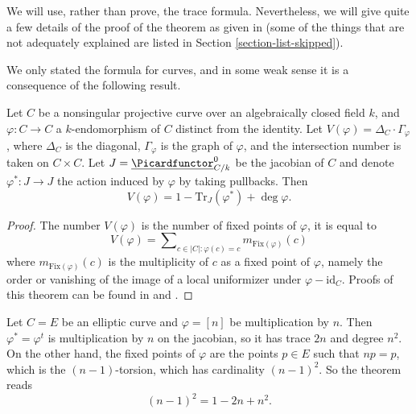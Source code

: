 \noindent
We will use, rather than prove, the trace formula. Nevertheless, we will
give quite a few details of the proof of the theorem as given in
\cite{SGA4.5} (some of the things that are not adequately explained
are listed in Section \ref{section-list-skipped}).

\medskip\noindent
We only stated the formula for curves, and in some weak
sense it is a consequence of the following result.

\begin{theorem}[Weil]
\label{theorem-weil-trace-formula}
Let $C$ be a nonsingular projective curve over an algebraically closed field
$k$, and $\varphi : C \to C$ a $k$-endomorphism of $C$ distinct from the
identity. Let $V(\varphi) = \Delta_C \cdot \Gamma_\varphi$, where $\Delta_C$ is
the diagonal, $\Gamma_\varphi$ is the graph of $\varphi$, and the intersection
number is taken on $C \times C$. Let $J = \underline{\Picardfunctor}^0_{C/k}$
be the jacobian of $C$ and denote $\varphi^* : J \to J$ the action induced by
$\varphi$ by taking pullbacks. Then
$$
V(\varphi) = 1 - \text{Tr}_J(\varphi^*) + \deg \varphi.
$$
\end{theorem}

\begin{proof}
The number $V(\varphi)$ is the number of fixed points of $\varphi$, it is equal
to
$$
V(\varphi) =
\sum\nolimits_{c \in |C| : \varphi(c) = c} m_{\text{Fix}(\varphi)} (c)
$$
where $m_{\text{Fix}(\varphi)} (c)$ is the multiplicity of $c$ as a fixed point
of $\varphi$, namely the order or vanishing of the image of a local uniformizer
under $\varphi - \text{id}_C$. Proofs of this theorem can be found in
\cite{Lang} and \cite{Weil}.
\end{proof}

\begin{example}
\label{example-elliptic-curve}
Let $C = E$ be an elliptic curve and $\varphi = [n]$ be multiplication by $n$.
Then $\varphi^* = \varphi^t$ is multiplication by $n$ on the jacobian, so it
has trace $2n$ and degree $n^2$. On the other hand, the fixed points of
$\varphi$ are the points $p \in E$ such that $n p = p$, which is the
$(n-1)$-torsion, which has cardinality $(n-1)^2$. So the theorem reads
$$
(n-1)^2 = 1 - 2n + n^2.
$$
\end{example}


